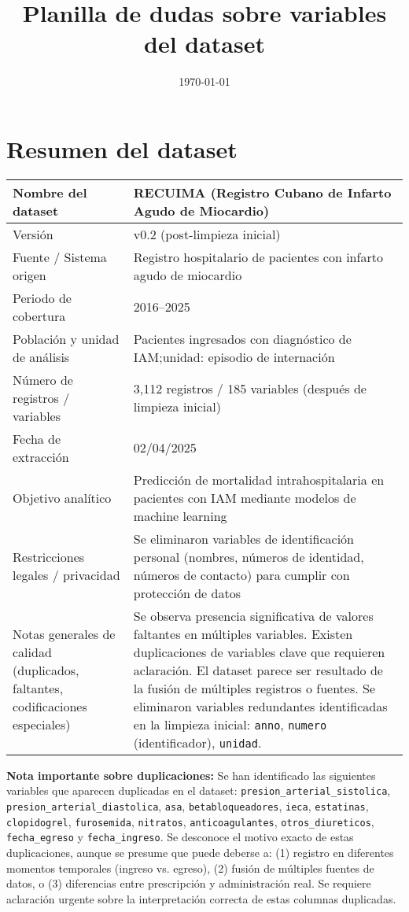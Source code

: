 \documentclass[11pt,a4paper]{article}
\title{Planilla de dudas sobre variables del dataset}
\author{\Responsable}
\date{\today}
\newcommand{\DatasetNombre}{RECUIMA (Registro Cubano de Infarto Agudo de Miocardio)}
\newcommand{\DatasetVersion}{v0.2 (post-limpieza inicial)}
\begin{document}
\maketitle

\section*{Resumen del dataset}
\small
\setlength{\tabcolsep}{3pt}
\setlength{\arrayrulewidth}{0.6pt}
\begin{tabular}{|L{0.28\textwidth}|L{0.68\textwidth}|}
\hline
Nombre del dataset & \DatasetNombre \\ \hline
Versión & \DatasetVersion \\ \hline
Fuente / Sistema origen & Registro hospitalario de pacientes con infarto agudo de miocardio \\ \hline
Periodo de cobertura & 2016--2025 \\ \hline
Población y unidad de análisis & Pacientes ingresados con diagnóstico de IAM;unidad: episodio de internación \\ \hline
Número de registros / variables & 3,112 registros / 185 variables (después de limpieza inicial) \\ \hline
Fecha de extracción & 02/04/2025 \\ \hline
Objetivo analítico & Predicción de mortalidad intrahospitalaria en pacientes con IAM mediante modelos de machine learning \\ \hline
Restricciones legales / privacidad & Se eliminaron variables de identificación personal (nombres, números de identidad, números de contacto) para cumplir con protección de datos \\ \hline
Notas generales de calidad (duplicados, faltantes, codificaciones especiales) & Se observa presencia significativa de valores faltantes en múltiples variables. Existen duplicaciones de variables clave que requieren aclaración. El dataset parece ser resultado de la fusión de múltiples registros o fuentes. Se eliminaron variables redundantes identificadas en la limpieza inicial: \texttt{anno}, \texttt{numero} (identificador), \texttt{unidad}. \\ \hline
\end{tabular}

\vspace{1em}
\noindent\textbf{Nota importante sobre duplicaciones:} Se han identificado las siguientes variables que aparecen duplicadas en el dataset: \texttt{presion\_arterial\_sistolica}, \texttt{presion\_arterial\_diastolica}, \texttt{asa}, \texttt{betabloqueadores}, \texttt{ieca}, \texttt{estatinas}, \texttt{clopidogrel}, \texttt{furosemida}, \texttt{nitratos}, \texttt{anticoagulantes}, \texttt{otros\_diureticos}, \texttt{fecha\_egreso} y \texttt{fecha\_ingreso}. Se desconoce el motivo exacto de estas duplicaciones, aunque se presume que puede deberse a: (1) registro en diferentes momentos temporales (ingreso vs. egreso), (2) fusión de múltiples fuentes de datos, o (3) diferencias entre prescripción y administración real. Se requiere aclaración urgente sobre la interpretación correcta de estas columnas duplicadas.
\end{document}
